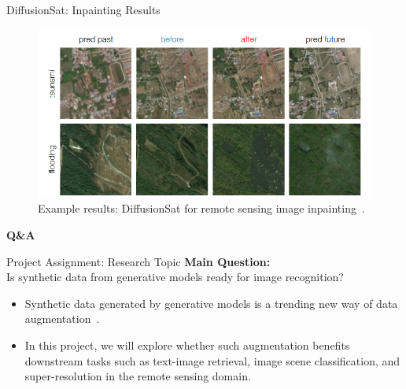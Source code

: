 \begin{refsection}
\begin{frame}{DiffusionSat: Inpainting Results}
  \begin{figure}
    \centering
    \includegraphics[width=0.9\linewidth]{figs/diffusionsat_inpainting_results.png}
    \caption[]{\scriptsize Example results: DiffusionSat for remote sensing image inpainting~\parencite{diffusionset2024}.}
  \end{figure}
  \bottomleftrefs
\end{frame}
\end{refsection}



\begin{refsection}
\begin{frame}[plain]
  \vfill
  \centering
  {\LARGE \textbf{Q\&A}}
  \vfill
\end{frame}
\end{refsection}

\begin{refsection}
  \begin{frame}{Project Assignment: Research Topic}
    \textbf{Main Question:} \\
    \vspace{0.5em}
    Is synthetic data from generative models ready for image recognition?
  
    \vspace{1em}
    \begin{itemize}
      \item Synthetic data generated by generative models is a trending new way of data augmentation~\parencite{heSYNTHETICDATAGENERATIVE2022,tokerSatSynthAugmentingImageMask2024}.
      \item In this project, we will explore whether such augmentation benefits downstream tasks such as text-image retrieval, image scene classification, and super-resolution in the remote sensing domain.
    \end{itemize}
    \bottomleftrefs
  \end{frame}
  \end{refsection}

